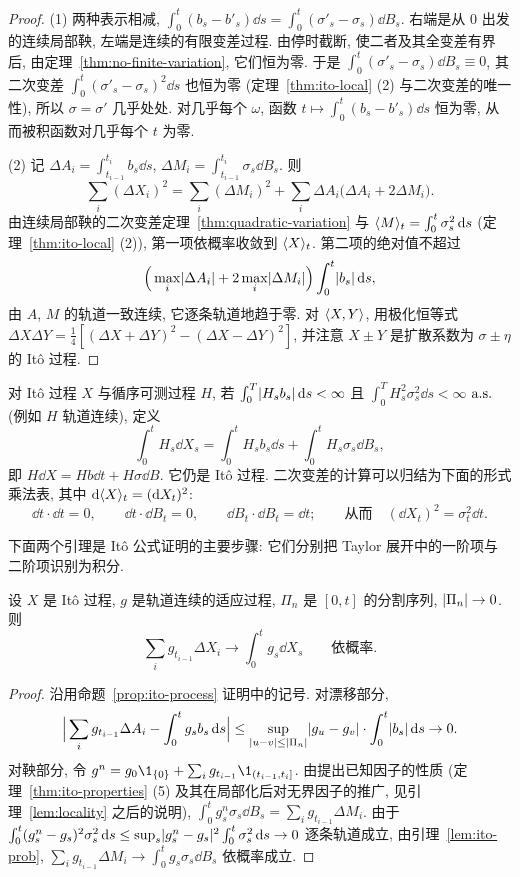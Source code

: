\begin{proof}
(1) 两种表示相减, $\int_0^t(b_s-b'_s)\dd s=\int_0^t(\sigma'_s-\sigma_s)\dd B_s$. 右端是从 $0$ 出发的连续局部鞅, 左端是连续的有限变差过程. 由停时截断, 使二者及其全变差有界后, 由定理~\ref{thm:no-finite-variation}, 它们恒为零. 于是 $\int_0^t(\sigma'_s-\sigma_s)\dd B_s\equiv0$, 其二次变差 $\int_0^t(\sigma'_s-\sigma_s)^2\dd s$ 也恒为零 (定理~\ref{thm:ito-local} (2) 与二次变差的唯一性), 所以 $\sigma=\sigma'$ 几乎处处. 对几乎每个 $\omega$, 函数 $t\mapsto\int_0^t(b_s-b'_s)\dd s$ 恒为零, 从而被积函数对几乎每个 $t$ 为零.

(2) 记 $\Delta A_i=\int_{t_{i-1}}^{t_i}b_s\dd s$, $\Delta M_i=\int_{t_{i-1}}^{t_i}\sigma_s\dd B_s$. 则
\[
\sum_i(\Delta X_i)^2=\sum_i(\Delta M_i)^2+\sum_i\Delta A_i\big(\Delta A_i+2\Delta M_i\big).
\]
由连续局部鞅的二次变差定理~\ref{thm:quadratic-variation} 与 $\langle M\rangle_t=\int_0^t\sigma_s^2\mathop{}\!\mathrm{d} s$ (定理~\ref{thm:ito-local} (2)), 第一项依概率收敛到 $\langle X\rangle_t$. 第二项的绝对值不超过
\[
\Big(\max_i\lvert\Delta A_i\rvert+2\max_i\lvert\Delta M_i\rvert\Big)\int_0^t\lvert b_s\rvert\mathop{}\!\mathrm{d} s,
\]
由 $A$, $M$ 的轨道一致连续, 它逐条轨道地趋于零. 对 $\langle X,Y\rangle$, 用极化恒等式 $\Delta X\Delta Y=\frac{1}{4}[(\Delta X+\Delta Y)^2-(\Delta X-\Delta Y)^2]$, 并注意 $X\pm Y$ 是扩散系数为 $\sigma\pm\eta$ 的 It\^o 过程.
\end{proof}

对 It\^o 过程 $X$ 与循序可测过程 $H$, 若 $\int_0^T\lvert H_sb_s\rvert\mathop{}\!\mathrm{d} s<\infty$ 且 $\int_0^TH_s^2\sigma_s^2\dd s<\infty$ $\text{a.s.}$ (例如 $H$ 轨道连续), 定义
\[
\int_0^tH_s\dd X_s=\int_0^tH_sb_s\dd s+\int_0^tH_s\sigma_s\dd B_s,
\]
即 $H\dd X=Hb\dd t+H\sigma\dd B$. 它仍是 It\^o 过程. 二次变差的计算可以归结为下面的形式乘法表, 其中 $\mathop{}\!\mathrm{d}\langle X\rangle_t=(\mathop{}\!\mathrm{d} X_t)^2$:
\begin{equation}\label{eq:mult-table}
\dd t\cdot\dd t=0,\qquad\dd t\cdot\dd B_t=0,\qquad\dd B_t\cdot\dd B_t=\dd t;\qquad\text{从而}\quad(\dd X_t)^2=\sigma_t^2\dd t.
\end{equation}

下面两个引理是 It\^o 公式证明的主要步骤: 它们分别把 Taylor 展开中的一阶项与二阶项识别为积分.

\begin{lemma}\label{lem:riemann-dX}
设 $X$ 是 It\^o 过程, $g$ 是轨道连续的适应过程, $\Pi_n$ 是 $[0,t]$ 的分割序列, $\lvert\Pi_n\rvert\to0$. 则
\[
\sum_ig_{t_{i-1}}\Delta X_i\to\int_0^tg_s\dd X_s\qquad\text{依概率}.
\]
\end{lemma}

\begin{proof}
沿用命题~\ref{prop:ito-process} 证明中的记号. 对漂移部分,
\[
\Big\lvert\sum_ig_{t_{i-1}}\Delta A_i-\int_0^tg_sb_s\mathop{}\!\mathrm{d} s\Big\rvert\le\sup_{\lvert u-v\rvert\le\lvert\Pi_n\rvert}\lvert g_u-g_v\rvert\cdot\int_0^t\lvert b_s\rvert\mathop{}\!\mathrm{d} s\to0.
\]
对鞅部分, 令 $g^n=g_0\1_{\{0\}}+\sum_ig_{t_{i-1}}\1_{(t_{i-1},t_i]}$. 由提出已知因子的性质 (定理~\ref{thm:ito-properties} (5) 及其在局部化后对无界因子的推广, 见引理~\ref{lem:locality} 之后的说明), $\int_0^tg^n_s\sigma_s\dd B_s=\sum_ig_{t_{i-1}}\Delta M_i$. 由于 $\int_0^t(g^n_s-g_s)^2\sigma_s^2\mathop{}\!\mathrm{d} s\le\sup_s\lvert g^n_s-g_s\rvert^2\int_0^t\sigma_s^2\mathop{}\!\mathrm{d} s\to0$ 逐条轨道成立, 由引理~\ref{lem:ito-prob}, $\sum_ig_{t_{i-1}}\Delta M_i\to\int_0^tg_s\sigma_s\dd B_s$ 依概率成立.
\end{proof}

